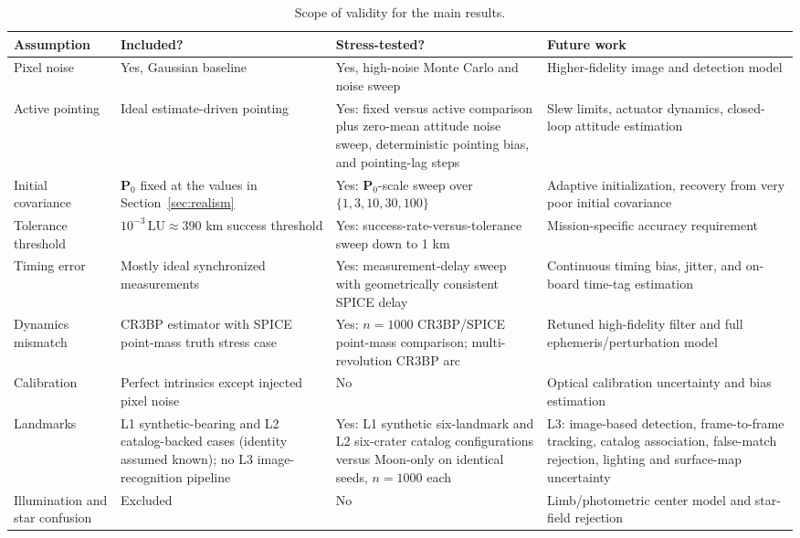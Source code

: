 \documentclass[10pt,twocolumn]{article}
\newcommand{\vect}[1]{\mathbf{#1}}
\newcommand{\LU}{\mathrm{LU}}
\begin{document}
\begin{table}[t]
\centering
\caption{Scope of validity for the main results.}
\label{tab:assumptions}
\scriptsize
\setlength{\tabcolsep}{3pt}
\begin{tabular}{@{}p{}p{}p{}p{}@{}}
\toprule
Assumption & Included? & Stress-tested? & Future work \\
\midrule
Pixel noise & Yes, Gaussian baseline & Yes, high-noise Monte Carlo and noise sweep & Higher-fidelity image and detection model \\
Active pointing & Ideal estimate-driven pointing & Yes: fixed versus active comparison plus zero-mean attitude noise sweep, deterministic pointing bias, and pointing-lag steps & Slew limits, actuator dynamics, closed-loop attitude estimation \\
Initial covariance & $\vect{P}_0$ fixed at the values in Section~\ref{sec:realism} & Yes: $\vect{P}_0$-scale sweep over $\{1,3,10,30,100\}$ & Adaptive initialization, recovery from very poor initial covariance \\
Tolerance threshold & $10^{-3}\,\LU\approx 390$ km success threshold & Yes: success-rate-versus-tolerance sweep down to 1 km & Mission-specific accuracy requirement \\
Timing error & Mostly ideal synchronized measurements & Yes: measurement-delay sweep with geometrically consistent SPICE delay & Continuous timing bias, jitter, and on-board time-tag estimation \\
Dynamics mismatch & CR3BP estimator with SPICE point-mass truth stress case & Yes: $n=1000$ CR3BP/SPICE point-mass comparison; multi-revolution CR3BP arc & Retuned high-fidelity filter and full ephemeris/perturbation model \\
Calibration & Perfect intrinsics except injected pixel noise & No & Optical calibration uncertainty and bias estimation \\
Landmarks & L1 synthetic-bearing and L2 catalog-backed cases (identity assumed known); no L3 image-recognition pipeline & Yes: L1 synthetic six-landmark and L2 six-crater catalog configurations versus Moon-only on identical seeds, $n=1000$ each & L3: image-based detection, frame-to-frame tracking, catalog association, false-match rejection, lighting and surface-map uncertainty \\
Illumination and star confusion & Excluded & No & Limb/photometric center model and star-field rejection \\
\bottomrule
\end{tabular}
\end{table}
\end{document}
